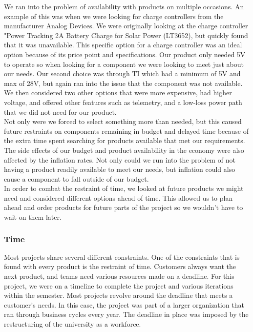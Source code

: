We ran into the problem of availability with products on multiple occasions. An example of this was when we were looking for charge controllers from the manufacturer Analog Devices. We were originally looking at the charge controller "Power Tracking 2A Battery Charge for Solar Power (LT3652), but quickly found that it was unavailable. This specific option for a charge controller was an ideal option because of its price point and specifications. Our product only needed 5V to operate so when looking for a component we were looking to meet just about our needs. Our second choice was through TI which had a minimum of 5V and max of 28V, but again ran into the issue that the component was not available. We then considered two other options that were more expensive, had higher voltage, and offered other features such as telemetry, and a low-loss power path that we did not need for our product.\\

Not only were we forced to select something more than needed, but this caused future restraints on components remaining in budget and delayed time because of the extra time spent searching for products available that met our requirements.\\

The side effects of our budget and product availability in the economy were also affected by the inflation rates. Not only could we run into the problem of not having a product readily available to meet our needs, but inflation could also cause a component to fall outside of our budget. \\

In order to combat the restraint of time, we looked at future products we might need and considered different options ahead of time. This allowed us to plan ahead and order products for future parts of the project so we wouldn't have to wait on them later.\\
\subsubsection{Time}
Most projects share several different constraints. One of the constraints that is found with every product is the restraint of time. Customers always want the next product, and teams need various resources made on a deadline. For this project, we were on a timeline to complete the project and various iterations within the semester. Most projects revolve around the deadline that meets a customer's needs. In this case, the project was part of a larger organization that ran through business cycles every year. The deadline in place was imposed by the restructuring of the university as a workforce.\\

